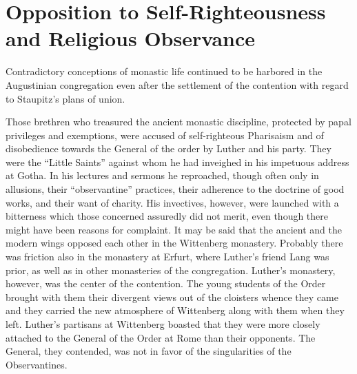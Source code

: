 \section{Opposition to Self-Righteousness and Religious Observance}

Contradictory conceptions of monastic life continued to be harbored
in the Augustinian congregation even after the settlement of
the contention with regard to Staupitz’s plans of union.

Those brethren who treasured the ancient monastic discipline,
protected by papal privileges and exemptions, were accused of self-righteous
Pharisaism and of disobedience towards the General of the
order by Luther and his party. They were the “Little Saints” against
whom he had inveighed in his impetuous address at Gotha. In his
lectures and sermons he reproached, though often only in allusions,
their “observantine” practices, their adherence to the doctrine of
good works, and their want of charity. His invectives, however,
were launched with a bitterness which those concerned assuredly
did not merit, even though there might have been reasons for complaint.
It may be said that the ancient and the modern wings opposed
each other in the Wittenberg monastery. Probably there was friction
also in the monastery at Erfurt, where Luther’s friend Lang was
prior, as well as in other monasteries of the congregation. Luther’s
monastery, however, was the center of the contention. The young
students of the Order brought with them their divergent views out
of the cloisters whence they came and they carried the new atmosphere
of Wittenberg along with them when they left. Luther’s partisans
at Wittenberg boasted that they were more closely attached to the
General of the Order at Rome than their opponents. The General,
they contended, was not in favor of the singularities of the Observantines.

